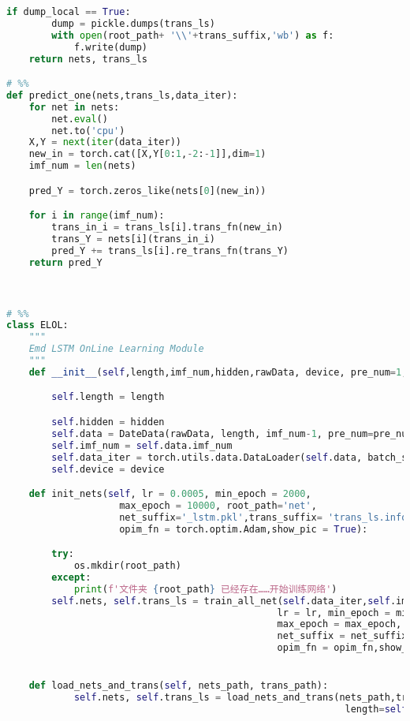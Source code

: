\begin{appendices}
\begin{lstlisting}[language=python]
    if dump_local == True:
        dump = pickle.dumps(trans_ls)
        with open(root_path+ '\\'+trans_suffix,'wb') as f:
            f.write(dump)
    return nets, trans_ls

# %%
def predict_one(nets,trans_ls,data_iter):
    for net in nets:
        net.eval()
        net.to('cpu')
    X,Y = next(iter(data_iter))
    new_in = torch.cat([X,Y[0:1,-2:-1]],dim=1)
    imf_num = len(nets)

    pred_Y = torch.zeros_like(nets[0](new_in))

    for i in range(imf_num):
        trans_in_i = trans_ls[i].trans_fn(new_in)
        trans_Y = nets[i](trans_in_i)
        pred_Y += trans_ls[i].re_trans_fn(trans_Y)
    return pred_Y



# %%
class ELOL:
    """
    Emd LSTM OnLine Learning Module
    """
    def __init__(self,length,imf_num,hidden,rawData, device, pre_num=1, dataSetWindows=1000):

        self.length = length

        self.hidden = hidden
        self.data = DateData(rawData, length, imf_num-1, pre_num=pre_num, dataSetWindows = dataSetWindows)
        self.imf_num = self.data.imf_num
        self.data_iter = torch.utils.data.DataLoader(self.data, batch_size = 1)
        self.device = device

    def init_nets(self, lr = 0.0005, min_epoch = 2000,
                    max_epoch = 10000, root_path='net',
                    net_suffix='_lstm.pkl',trans_suffix= 'trans_ls.info',
                    opim_fn = torch.optim.Adam,show_pic = True):

        try:
            os.mkdir(root_path)
        except:
            print(f'文件夹 {root_path} 已经存在……开始训练网络')
        self.nets, self.trans_ls = train_all_net(self.data_iter,self.imf_num + 1, self.device,
                                                lr = lr, min_epoch = min_epoch,
                                                max_epoch = max_epoch, root_path = root_path,
                                                net_suffix = net_suffix,trans_suffix= trans_suffix,
                                                opim_fn = opim_fn,show_pic = show_pic, length=self.length, hidden = self.hidden)


    def load_nets_and_trans(self, nets_path, trans_path):
            self.nets, self.trans_ls = load_nets_and_trans(nets_path,trans_path,
                                                            length=self.length, hidden= self.hidden)



\end{lstlisting}
\end{appendices}
